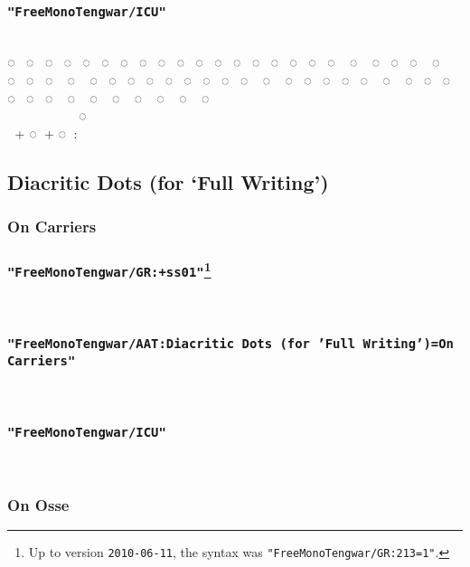 \documentclass{article}
\begin{document}
\subsubsection*{\texttt{"FreeMonoTengwar/ICU"}}

\freeICU
                          \\
◌ ◌ ◌ ◌ ◌ ◌ ◌ ◌ ◌ ◌ ◌ ◌ ◌ ◌ ◌ ◌ ◌ ◌ ◌ ◌ ◌ ◌ ◌ ◌ ◌ ◌ ◌ ◌ ◌ ◌ ◌ ◌ ◌ ◌ ◌ ◌ ◌ ◌ ◌ ◌ ◌ ◌ ◌ ◌ ◌ ◌ ◌ ◌ ◌ ◌ ◌ ◌ ◌ ◌ ◌ ◌\\
      ◌‍ ‍ ‍ ‍ \\
 \normalfont + \freeICU ◌ \normalfont + \freeICU ◌ : 


\newpage

\subsection{Diacritic Dots (for ‘Full Writing’)}

\subsubsection{On Carriers}

\subsubsection*{\texttt{"FreeMonoTengwar/GR:+ss01"}\footnote{Up to version \texttt{2010-06-11}, the syntax was \texttt{"FreeMonoTengwar/GR:213=1"}.}}

\carriersGR    

\subsubsection*{\texttt{"FreeMonoTengwar/AAT:Diacritic Dots (for 'Full Writing')=On Carriers"}}

\carriersAAT    

\subsubsection*{\texttt{"FreeMonoTengwar/ICU"}}

\freeICU     


\subsubsection{On Osse}
\end{document}
